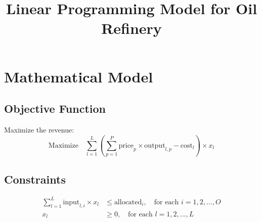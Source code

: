 \documentclass{article}
\begin{document}
\title{Linear Programming Model for Oil Refinery}
\author{}
\date{}
\maketitle

\section*{Mathematical Model}

\subsection*{Objective Function}
Maximize the revenue:
\begin{equation}
\text{Maximize} \quad \sum_{l=1}^{L} \left( \sum_{p=1}^{P} \text{price}_p \times \text{output}_{l,p} - \text{cost}_l \right) \times x_l
\end{equation}

\subsection*{Constraints}
\begin{align}
\sum_{l=1}^{L} \text{input}_{l,i} \times x_l & \leq \text{allocated}_i, \quad \text{for each } i = 1, 2, ..., O \\
x_l & \geq 0, \quad \text{for each } l = 1, 2, ..., L
\end{align}
\end{document}
